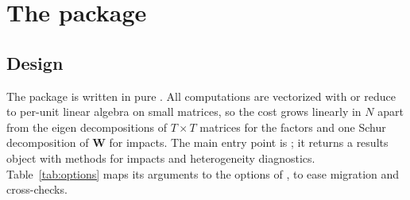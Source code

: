 \documentclass[article]{jss}
\newcommand{\fct}[1]{\code{#1()}}
\begin{document}
\section[The spdfiv package]{The  package} \label{sec:package}

\subsection{Design}

The package is written in pure . All computations are
vectorized with  or reduce to per-unit linear algebra on small
matrices, so the cost grows linearly in $N$ apart from the eigen
decompositions of $T\times T$ matrices for the factors and one Schur
decomposition of $\bm W$ for impacts. The main entry point is
\fct{fit}; it returns a results object with methods for impacts and
heterogeneity diagnostics. Table~\ref{tab:options} maps its arguments to the
options of , to ease migration and cross-checks.
\end{document}

